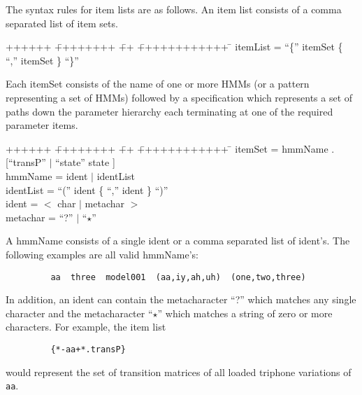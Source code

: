 The syntax rules for item lists are as follows.  An item list
consists of a comma separated list of item sets.
{\sf
\begin{tabbing}
++++++ \= ++++++++ \= ++ \= ++++++++++++ \=  \kill
\>     itemList\>  = \> ``\{'' itemSet \{ ``,'' itemSet \} ``\}'' 
\end{tabbing}}
\noindent
Each {\sf itemSet} consists of the name of one
or more HMMs (or a pattern
representing a set of HMMs) followed by a specification
which represents a set of paths down the parameter hierarchy 
each terminating at one of the required parameter items.
{\sf
\begin{tabbing}
++++++ \= ++++++++ \= ++ \= ++++++++++++ \=  \kill
\>      itemSet \>  = \> hmmName . [``transP'' $|$ ``state'' state ]\\
\>      hmmName \>  = \> ident $|$ identList \\
\>     identList\>  = \> ``('' ident \{ ``,'' ident \} ``)'' \\
\>     ident    \>  = \> $<$ char $|$ metachar $>$ \\
\>     metachar \>  = \> ``?'' $|$ ``$\star$''
\end{tabbing}}
\noindent
A {\sf hmmName} consists of a single {\sf ident} or
a comma separated list of {\sf ident}'s.  The following examples
are all valid {\sf hmmName}'s:
\begin{verbatim}
         aa  three  model001  (aa,iy,ah,uh)  (one,two,three)
\end{verbatim}
In addition, an {\sf ident} can contain the metacharacter
``?'' which matches any single character and the metacharacter
``$\star$'' which matches a string of zero or more characters.
For example, the item list
\begin{verbatim}
         {*-aa+*.transP}
\end{verbatim}
would represent the set of transition matrices of all loaded
triphone variations of \texttt{aa}.

